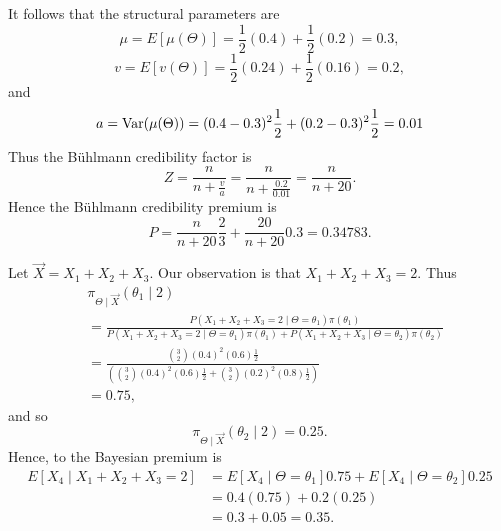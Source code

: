 \documentclass[notoc,notitlepage]{tufte-book}
\begin{document}
\begin{solution}
  It follows that the structural parameters are
  \begin{equation*}
    \mu = E[\mu(\Theta)] = \frac{1}{2}(0.4) + \frac{1}{2}(0.2) = 0.3,
  \end{equation*}
  \begin{equation*}
    v = E[v(\Theta)] = \frac{1}{2}(0.24) + \frac{1}{2}(0.16) = 0.2,
  \end{equation*}
  and
  \begin{equation*}
    a = \operatorname{Var}(\mu(\Theta)) = (0.4 - 0.3)^2 \frac{1}{2} + (0.2 - 0.3)^2
    \frac{1}{2} = 0.01
  \end{equation*}
  Thus the B\"{u}hlmann credibility factor is
  \begin{equation*}
    Z = \frac{n}{n + \frac{v}{a}}
      = \frac{n}{n + \frac{0.2}{0.01}} = \frac{n}{n + 20}.
  \end{equation*}
  Hence the B\"{u}hlmann credibility premium is
  \begin{equation*}
    P = \frac{n}{n + 20} \frac{2}{3} + \frac{20}{n + 20} 0.3 = 0.34783.
  \end{equation*}

  \noindent
   Let $\vec{X} = X_1 + X_2 + X_3$. Our observation
  is that $X_1 + X_2 + X_3 = 2$. Thus
  \begin{align*}
    &\pi_{\Theta \mid \vec{X}}(\theta_1 \mid 2) \\
    &= \frac{P(X_1 + X_2 + X_3 = 2 \mid \Theta = \theta_1) \pi(\theta_1)}{P(X_1
      + X_2 + X_3 = 2 \mid \Theta = \theta_1) \pi(\theta_1) + P(X_1 + X_2 + X_3
      \mid \Theta = \theta_2) \pi(\theta_2)} \\
    &= \frac{\binom{3}{2}(0.4)^2(0.6)
      \frac{1}{2}}{(\binom{3}{2}(0.4)^2(0.6)\frac{1}{2} +
      \binom{3}{2}(0.2)^2(0.8)\frac{1}{2})} \\
    &= 0.75,
  \end{align*}
  and so
  \begin{equation*}
    \pi_{\Theta \mid \vec{X}}(\theta_2 \mid 2) = 0.25.
  \end{equation*}
  Hence, to the Bayesian premium is
  \begin{align*}
    E[X_4 \mid X_1 + X_2 + X_3 = 2]
    &= E[X_4 \mid \Theta = \theta_1] 0.75 + E[X_4 \mid \Theta = \theta_2] 0.25 \\
    &= 0.4 (0.75) + 0.2 (0.25) \\
    &= 0.3 + 0.05 = 0.35.
  \end{align*}
\end{solution}
\end{document}
